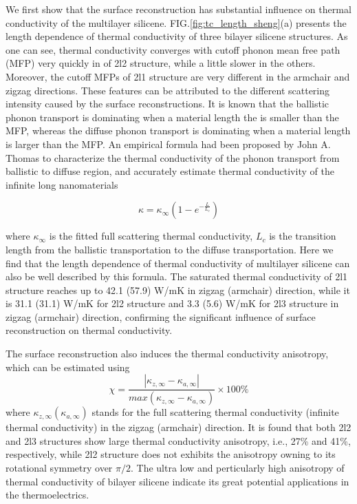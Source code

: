 \documentclass[aps,prb,twocolumn,showpacs,amsmath,amssymb]{revtex4-1}
\begin{document}
We first show that the surface reconstruction has substantial influence on thermal conductivity of the multilayer silicene.
FIG.\ref{fig:tc_length_sheng}(a) presents the length dependence of thermal conductivity of three bilayer silicene structures.
As one can see, thermal conductivity converges with cutoff phonon mean free path (MFP) very quickly in of 2l2  structure, while a little slower in the others. Moreover, the cutoff MFPs of 2l1 structure are very different in the armchair and zigzag directions. These features can be attributed to the different scattering intensity caused by the surface reconstructions.
It is known that the ballistic phonon transport is dominating  when a material length the is smaller than the MFP,  whereas the diffuse phonon transport is  dominating when a material length is larger than the MFP.
An empirical formula had been proposed by John A. Thomas\cite{Thomas2010}  to characterize the thermal conductivity of the phonon transport from ballistic to diffuse region, and accurately estimate thermal conductivity of the infinite long nanomaterials

\begin{equation}
  \kappa = \kappa_\infty (1-e^{-\frac{L}{L_c}}) \label{eq:eq_nemd}
\end{equation}

where $\kappa_\infty$ is the fitted full scattering thermal conductivity, $L_c$ is the transition length from the ballistic transportation to the diffuse transportation. Here we find that the length dependence of thermal conductivity of multilayer silicene can also be well described by this  formula.
The saturated thermal conductivity of 2l1 structure reaches up to 42.1 (57.9) W/mK in zigzag (armchair) direction, while it is  31.1 (31.1) W/mK  for 2l2 structure and  3.3 (5.6)  W/mK for 2l3 structure in zigzag (armchair) direction, confirming the significant influence of surface reconstruction on thermal conductivity.

The surface reconstruction also induces the thermal conductivity anisotropy, which can be estimated using
\begin{equation}
  \chi=\frac{|\kappa_{z,\infty}-\kappa_{a,\infty} |}{ max⁡(\kappa_{z,\infty}-\kappa_{a,\infty} ) } \times 100 \%  \label{eq:eq_chi}
\end{equation}
where $ \kappa_{z,\infty} (\kappa_{a,\infty})$ stands for the full scattering thermal conductivity (infinite thermal conductivity) in the zigzag (armchair) direction.
It is found that both 2l2 and 2l3 structures show large thermal conductivity anisotropy, i.e., 27\% and 41\%, respectively, while 2l2 structure does not exhibits the anisotropy owning to its rotational symmetry over $\pi/2$.  The ultra low and perticularly high anisotropy of thermal conductivity of bilayer silicene indicate its great potential applications in the thermoelectrics.
\end{document}

